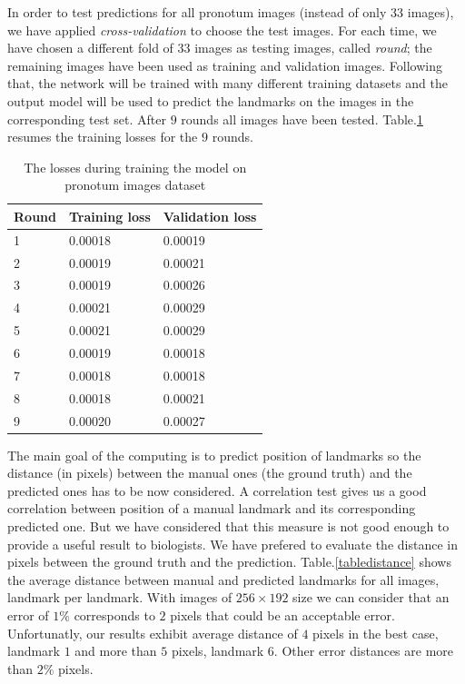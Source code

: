 \documentclass[10pt]{article}
\begin{document}
In order to test predictions for all pronotum images (instead of only $33$ images),
we have applied \textit{cross-validation} to choose the test images. For each time,
we have chosen a different fold of $33$ images as testing images, called \textit{round};
the remaining images have been used as training and validation images. Following that, the network will be trained with many
different training datasets and the output model will be used to
predict the landmarks on the images in the corresponding test
set. After $9$ rounds all images have been
tested. Table.\ref{tbltrainingloss} resumes the training losses for
the $9$ rounds.

\begin{table}[h!]
	\centering
	\begin{tabular}{l l l}
	Round & Training loss & Validation loss \\ \hline
	1 & 0.00018 & 0.00019  \\ \hline
	2 & 0.00019 & 0.00021 \\ \hline
	3 & 0.00019 & 0.00026 \\ \hline
	4 & 0.00021 & 0.00029 \\ \hline
	5 & 0.00021 & 0.00029 \\ \hline
	6 & 0.00019 & 0.00018 \\ \hline
	7 & 0.00018 & 0.00018 \\ \hline
	8 & 0.00018 & 0.00021 \\ \hline
	9 & 0.00020 & 0.00027 \\ \hline
	\end{tabular}
	\caption{\small{The losses during training the model on pronotum images dataset}}
	\label{tbltrainingloss}
\end{table}

The main goal of the computing is to predict position of landmarks so
the distance (in pixels) between the manual ones (the ground truth)
and the predicted ones has to be now considered. A correlation test
gives us a good correlation between position of a manual landmark and
its corresponding predicted one. But we have considered that this
measure is not good enough to provide a useful result to biologists. We
have prefered to evaluate the distance in pixels between the ground
truth and the prediction. Table.\ref{tabledistance} shows the
average distance between manual and predicted landmarks for all
images, landmark per landmark. With images of $256 \times 192$ size we
can consider that an error of $1\%$ corresponds to $2$ pixels that
could be an acceptable error. Unfortunatly, our results exhibit
average distance of $4$ pixels in the best case, landmark $1$ and more
than $5$ pixels, landmark $6$. Other error distances are more than $2\%$
pixels.
\end{document}
